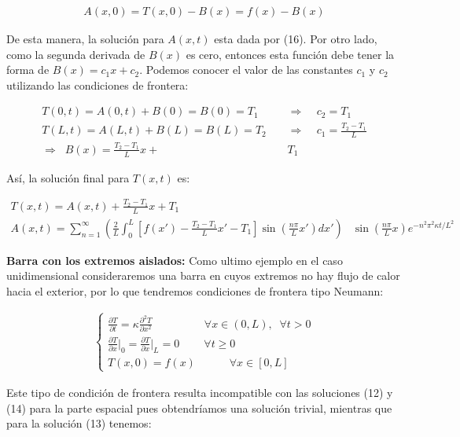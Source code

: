 \documentclass[12pt]{article}
\begin{document}
\begin{align*}
    A(x,0) = T(x,0)-B(x) = f(x) - B(x)
\end{align*}

De esta manera, la solución para $A(x,t)$ esta dada por (16). Por otro lado, como la segunda derivada de $B(x)$ es cero, entonces esta función debe tener la forma de $B(x) = c_1x + c_2$. Podemos conocer el valor de las constantes $c_1$ y $c_2$ utilizando las condiciones de frontera:

\begin{align*}
    T(0,t) = A(0,t)+B(0) = B(0) = T_1 \;\;\;\; &\Rightarrow \;\;\;\; c_2 = T_1 \\
    T(L,t) = A(L,t)+B(L) = B(L) = T_2 \;\;\;\; &\Rightarrow \;\;\;\; c_1 = \frac{T_2-T_1}{L} \\
    \Rightarrow \;\; B(x) = \frac{T_2-T_1}{L}x + &T_1
\end{align*}

Así, la solución final para $T(x,t)$ es:

\begin{align}
    T(x,t) = A(x,t) + \frac{T_2-T_1}{L}x + T_1 \;\;\;\;\;\;\;& \\
    \nonumber A(x,t) = \sum_{n=1}^{\infty} \left(\frac{2}{L}\int_0^L \left[f(x')-\frac{T_2-T_1}{L}x' -T_1\right]\sin \left(\frac{n\pi}{L}x'\right)dx'\right)&\sin\left(\frac{n\pi}{L}x\right) e^{-n^2\pi^2\kappa t/L^2}
\end{align}

\textbf{Barra con los extremos aislados: }Como ultimo ejemplo en el caso unidimensional consideraremos una barra en cuyos extremos no hay flujo de calor hacia el exterior, por lo que tendremos condiciones de frontera tipo Neumann:

\begin{align}
    \begin{cases}
        \frac{\partial T}{\partial t} = \kappa \frac{\partial^2 T}{\partial x^2} \;\;\;\;\;\;\;\;\;\;\;\;\;\;\;\;\; \forall x\in (0,L), \;\; \forall t>0 \\
        \frac{\partial T}{\partial x} \Big|_0 = \frac{\partial T}{\partial x}\Big|_L = 0 \;\;\;\;\;\;\;\; \forall t \geq 0 \\
        T(x,0) = f(x) \;\;\;\;\;\;\;\;\;\;\; \forall x\in [0,L]
    \end{cases}
\end{align}

Este tipo de condición de frontera resulta incompatible con las soluciones (12) y (14) para la parte espacial pues obtendríamos una solución trivial, mientras que para la solución (13) tenemos:
\end{document}
